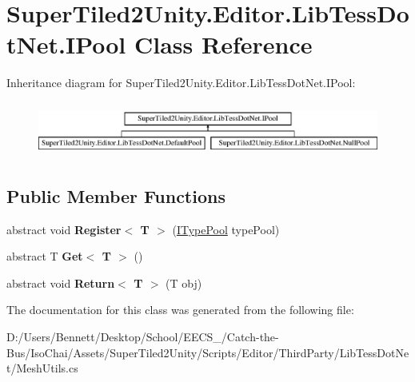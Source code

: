 \hypertarget{class_super_tiled2_unity_1_1_editor_1_1_lib_tess_dot_net_1_1_i_pool}{}\section{Super\+Tiled2\+Unity.\+Editor.\+Lib\+Tess\+Dot\+Net.\+I\+Pool Class Reference}
\label{class_super_tiled2_unity_1_1_editor_1_1_lib_tess_dot_net_1_1_i_pool}
Inheritance diagram for Super\+Tiled2\+Unity.\+Editor.\+Lib\+Tess\+Dot\+Net.\+I\+Pool\+:\begin{figure}[H]
\begin{center}
\leavevmode
\includegraphics[height=1.824104cm]{class_super_tiled2_unity_1_1_editor_1_1_lib_tess_dot_net_1_1_i_pool}
\end{center}
\end{figure}
\subsection*{Public Member Functions}
\begin{DoxyCompactItemize}
\item 
\mbox{\label{class_super_tiled2_unity_1_1_editor_1_1_lib_tess_dot_net_1_1_i_pool_a9191aafef59627290aede8696f61d0b1}} 
abstract void {\bfseries Register$<$ T $>$} (\mbox{\hyperlink{interface_super_tiled2_unity_1_1_editor_1_1_lib_tess_dot_net_1_1_i_type_pool}{I\+Type\+Pool}} type\+Pool)
\item 
\mbox{\label{class_super_tiled2_unity_1_1_editor_1_1_lib_tess_dot_net_1_1_i_pool_ae21b4211be4f8443b0b7a05a48947fec}} 
abstract T {\bfseries Get$<$ T $>$} ()
\item 
\mbox{\label{class_super_tiled2_unity_1_1_editor_1_1_lib_tess_dot_net_1_1_i_pool_a23ffa064945bcde85e171982af5733e7}} 
abstract void {\bfseries Return$<$ T $>$} (T obj)
\end{DoxyCompactItemize}


The documentation for this class was generated from the following file\+:\begin{DoxyCompactItemize}
\item 
D\+:/\+Users/\+Bennett/\+Desktop/\+School/\+E\+E\+C\+S\+\_/\+Catch-\/the-\/\+Bus/\+Iso\+Chai/\+Assets/\+Super\+Tiled2\+Unity/\+Scripts/\+Editor/\+Third\+Party/\+Lib\+Tess\+Dot\+Net/Mesh\+Utils.\+cs\end{DoxyCompactItemize}
